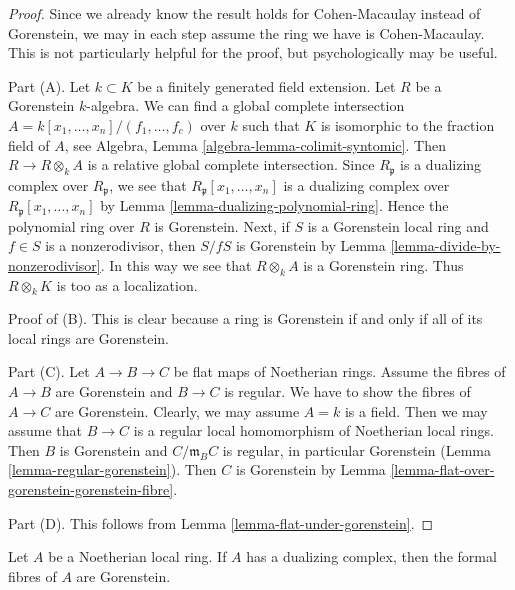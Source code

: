 \begin{proof}
Since we already know the result holds for Cohen-Macaulay instead
of Gorenstein, we may in each step assume the ring we have is
Cohen-Macaulay. This is not particularly helpful for the proof, but
psychologically may be useful.

\medskip\noindent
Part (A). Let $k \subset K$ be a finitely generated field extension.
Let $R$ be a Gorenstein $k$-algebra.
We can find a global complete intersection
$A = k[x_1, \ldots, x_n]/(f_1, \ldots, f_c)$
over $k$ such that $K$ is isomorphic to the fraction field of $A$, see
Algebra, Lemma \ref{algebra-lemma-colimit-syntomic}.
Then $R \to R \otimes_k A$ is a relative global complete intersection.
Since $R_\mathfrak p$ is a dualizing complex over $R_\mathfrak p$,
we see that $R_\mathfrak p[x_1, \ldots, x_n]$ is a dualizing
complex over $R_\mathfrak p[x_1, \ldots, x_n]$ by
Lemma \ref{lemma-dualizing-polynomial-ring}.
Hence the polynomial ring over $R$ is Gorenstein.
Next, if $S$ is a Gorenstein local ring and $f \in S$ is
a nonzerodivisor, then $S/fS$ is Gorenstein by
Lemma \ref{lemma-divide-by-nonzerodivisor}.
In this way we see that $R \otimes_k A$ is a Gorenstein ring.
Thus $R \otimes_k K$ is too as a localization.

\medskip\noindent
Proof of (B). This is clear because a ring is Gorenstein
if and only if all of its local rings are Gorenstein.

\medskip\noindent
Part (C). Let $A \to B \to C$ be flat maps of Noetherian rings.
Assume the fibres of $A \to B$ are Gorenstein and $B \to C$ is regular.
We have to show the fibres of $A \to C$ are Gorenstein.
Clearly, we may assume $A = k$ is a field. Then we may assume that
$B \to C$ is a regular local homomorphism of Noetherian local rings.
Then $B$ is Gorenstein and $C/\mathfrak m_B C$ is regular, in
particular Gorenstein (Lemma \ref{lemma-regular-gorenstein}).
Then $C$ is Gorenstein by
Lemma \ref{lemma-flat-over-gorenstein-gorenstein-fibre}.

\medskip\noindent
Part (D). This follows from Lemma \ref{lemma-flat-under-gorenstein}.
\end{proof}

\begin{lemma}
\label{lemma-dualizing-gorenstein-formal-fibres}
Let $A$ be a Noetherian local ring. If $A$ has a dualizing complex,
then the formal fibres of $A$ are Gorenstein.
\end{lemma}


